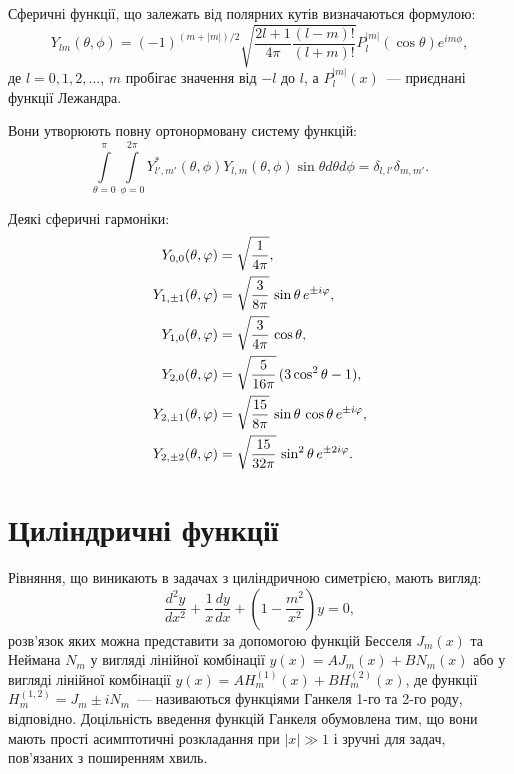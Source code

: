 Сферичні функції, що залежать від полярних кутів визначаються формулою:
\begin{equation*}
    Y_{lm}(\theta,\phi) = (-1)^{(m+|m|)/2} \sqrt{\frac{2l+1}{4\pi}\frac{(l-m)!}{(l+m)!}}P_l^{|m|}(\cos \theta) e^{im\phi},
\end{equation*}
де $l = 0,1,2, \ldots$, $m$ пробігає значення від $-l$ до $l$, а $P_l^{|m|}(x)$~--- приєднані функції Лежандра.

Вони утворюють повну ортонормовану систему функцій:
\[
    \int\limits_{\theta=0}^{\pi} \int\limits_{\phi=0}^{2\pi} Y^*_{l',m'}(\theta, \phi) Y_{l,m}(\theta, \phi) \sin\theta d\theta d\phi  = \delta_{l,l'} \delta_{m,m'}.
\]

Деякі сферичні гармоніки:
\begin{align*}
	Y_{0,0}(\theta,\phi)     & =\sqrt{1\over 4\pi},                                            \\
	Y_{1,\pm 1}(\theta,\phi) & =\sqrt{3\over 8\pi} \, \sin\theta \, e^{\pm i\phi},             \\
	Y_{1,0}(\theta,\phi)     & =\sqrt{3\over 4\pi}\, \cos\theta ,                              \\
	Y_{2,0}(\theta,\phi)     & =\sqrt{5\over 16\pi}\, (3\cos^{2}\theta-1),                     \\
	Y_{2,\pm 1}(\theta,\phi) & =\sqrt{15\over 8\pi}\, \sin\theta\, \cos\theta\, e^{\pm i\phi}, \\
	Y_{2,\pm 2}(\theta,\phi) & =\sqrt{15\over 32\pi} \, \sin^{2}\theta \, e^{\pm2i\phi}.
\end{align*}

\section{Циліндричні функції}\setcounter{equation}{0}

Рівняння, що виникають в задачах з циліндричною симетрією, мають вигляд:
	\begin{equation}\label{eq:Bessel_eq}
		\frac{d^2y}{dx^2} + \frac1x\frac{dy}{dx} + \left(1 - \frac{m^2}{x^2} \right) y = 0,
	\end{equation}
	розв'язок яких можна представити за допомогою функцій Бесселя $J_m(x)$ та Неймана $N_m$ у вигляді лінійної комбінації $y(x) = A J_m(x) + B N_m(x)$ або у вигляді лінійної комбінації $y(x) = A H^{(1)}_m(x) + B H^{(2)}_m(x)$, де функції $H_m^{(1,2)} =J_m \pm i N_m$~--- називаються функціями Ганкеля 1-го та 2-го роду, відповідно. Доцільність введення функцій Ганкеля обумовлена тим, що вони мають прості асимптотичні розкладання при $|x| \gg 1$ і зручні для задач, пов'язаних з поширенням хвиль.

